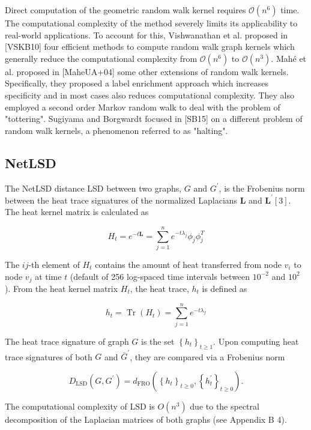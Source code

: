 Direct computation of the geometric random walk kernel requires $\mathcal{O}\left(n^{6}\right)$ time. The computational complexity of the method severely limits its applicability to real-world applications. To account for this, Vishwanathan et al. proposed in [VSKB10] four efficient methods to compute random walk graph kernels which generally reduce the computational complexity from $\mathcal{O}\left(n^{6}\right)$ to $\mathcal{O}\left(n^{3}\right)$. Mahé et al. proposed in [MaheUA+04] some other extensions of random walk kernels. Specifically, they proposed a label enrichment approach which increases specificity and in most cases also reduces computational complexity. They also employed a second order Markov random walk to deal with the problem of "tottering". Sugiyama and Borgwardt focused in [SB15] on a different problem of random walk kernels, a phenomenon referred to as "halting".


\subsection{NetLSD}
The NetLSD distance LSD between two graphs, $G$ and $G^{\prime}$, is the Frobenius norm between the heat trace signatures of the normalized Laplacians $\mathbf{L}$ and $\mathbf{L}^{\prime}[3]$. The heat kernel matrix is calculated as

$$
H_{t}=e^{-t \mathbf{L}}=\sum_{j=1}^{n} e^{-t \lambda_{j}} \phi_{j} \phi_{j}^{T}
$$

The $i j$-th element of $H_{t}$ contains the amount of heat transferred from node $v_{i}$ to node $v_{j}$ at time $t$ (default of 256 log-spaced time intervals between $10^{-2}$ and $10^{2}$ ). From the heat kernel matrix $H_{t}$, the heat trace, $h_{t}$ is defined as

$$
h_{t}=\operatorname{Tr}\left(H_{t}\right)=\sum_{j=1}^{n} e^{-t \lambda_{f}}
$$

The heat trace signature of graph $G$ is the set $\left\{h_{t}\right\}_{t \geq 1}$. Upon computing heat trace signatures of both $G$ and $\bar{G}^{\prime}$, they are compared via a Frobenius norm

$$
D_{\mathrm{LSD}}\left(G, G^{\prime}\right)=d_{\mathrm{FRO}}\left(\left\{h_{t}\right\}_{t \geq 0},\left\{h_{t}^{\prime}\right\}_{t \geq 0}\right) .
$$

The computational complexity of LSD is $O\left(n^{3}\right)$ due to the spectral decomposition of the Laplacian matrices of both graphs (see Appendix B 4).

